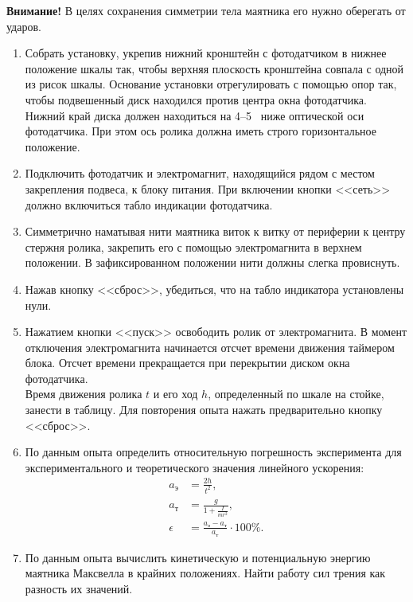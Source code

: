 \documentclass[a4paper, 12pt]{extarticle}
\newcommand{\eps}{\epsilon}
\begin{document}
\textbf{Внимание!} В целях сохранения симметрии тела маятника его нужно оберегать от ударов. %
\begin{enumerate}
\item Собрать установку, укрепив нижний кронштейн с фотодатчиком в нижнее положение шкалы так, чтобы верхняя плоскость кронштейна совпала с одной из рисок шкалы. Основание установки отрегулировать с помощью опор так, чтобы подвешенный диск находился против центра окна фотодатчика. Нижний край диска должен находиться на 4--5~ ниже оптической оси фотодатчика. При этом ось ролика должна иметь строго горизонтальное положение.
\item Подключить фотодатчик и электромагнит, находящийся рядом с местом закрепления подвеса, к блоку питания. При включении кнопки <<сеть>> должно включиться табло индикации фотодатчика.
\item Симметрично наматывая нити маятника виток к витку от периферии к центру стержня ролика, закрепить его с помощью электромагнита в верхнем положении. В зафиксированном положении нити должны слегка провиснуть.
\item Нажав кнопку <<сброс>>, убедиться, что на табло индикатора установлены нули.
\item Нажатием кнопки <<пуск>> освободить ролик от электромагнита. В момент отключения электромагнита начинается отсчет времени движения таймером блока. Отсчет времени прекращается при перекрытии диском окна фотодатчика. \\
Время движения ролика $t$ и его ход $h$, определенный по шкале на стойке, занести в таблицу. Для повторения опыта нажать предварительно кнопку <<сброс>>.
\item По данным опыта определить относительную погрешность эксперимента для экспериментального и теоретического значения линейного ускорения:
\begin{align*}
a_\text{э} &= \frac{2h}{t^2}, \\%
a_\text{т} &= \frac{g}{1 + \frac{I}{mr^2}}, \\
\eps &= \frac{a_\text{э} - a_\text{т}}{a_\text{т}} \cdot 100 \%. %
\end{align*}
\item По данным опыта вычислить кинетическую и потенциальную энергию маятника Максвелла в крайних положениях. Найти работу сил трения как разность их значений.
\end{enumerate}
\end{document}
